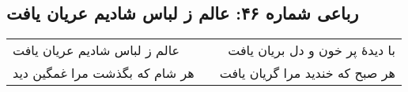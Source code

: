 \begin{center}
\section*{رباعی شماره ۴۶: عالم ز لباس شادیم عریان یافت}
\label{sec:046}
\begin{longtable}{l p{0.5cm} r}
عالم ز لباس شادیم عریان یافت
&&
با دیدهٔ پر خون و دل بریان یافت
\\
هر شام که بگذشت مرا غمگین دید
&&
هر صبح که خندید مرا گریان یافت
\\
\end{longtable}
\end{center}
